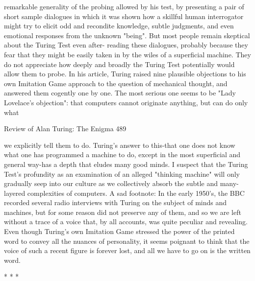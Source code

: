 remarkable generality of the probing allowed by his test, by presenting a pair of short
sample dialogues in which it was shown how a skillful human interrogator might try
to elicit odd and recondite knowledge, subtle judgments, and even emotional
responses from the unknown "being". But most people remain skeptical about the
Turing Test even after- reading these dialogues, probably because they fear that they
might be easily taken in by the wiles of a superficial machine. They do not appreciate
how deeply and broadly the Turing Test potentially would allow them to probe.
         In his article, Turing raised nine plausible objections to his own Imitation
Game approach to the question of mechanical thought, and answered them cogently
one by one. The most serious one seems to be "Lady Lovelace's objection": that
computers cannot originate anything, but can do only what




Review of Alan Turing: The Enigma                                                      489

we explicitly tell them to do. Turing's answer to this-that one does not know what one
has programmed a machine to do, except in the most superficial and general way-has
a depth that eludes many good minds. I suspect that the Turing Test's profundity as an
examination of an alleged "thinking machine" will only gradually seep into our
culture as we collectively absorb the subtle and many-layered complexities of
computers.
        A sad footnote: In the early 1950's, the BBC recorded several radio interviews
with Turing on the subject of minds and machines, but for some reason did not
preserve any of them, and so we are left without a trace of a voice that, by all
accounts, was quite peculiar and revealing. Even though Turing's own Imitation Game
stressed the power of the printed word to convey all the nuances of personality, it
seems poignant to think that the voice of such a recent figure is forever lost, and all
we have to go on is the written word.

                                       *   *   *

